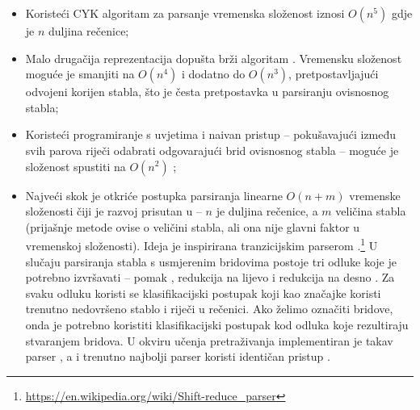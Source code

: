 \begin{itemize}
  \item Koristeći CYK algoritam za parsanje vremenska složenost iznosi
  $O(n^5)$ gdje je $n$ duljina rečenice;

  \item Malo drugačija reprezentacija dopušta brži algoritam
  \citep{eisner1999efficient}. Vremensku složenost moguće je smanjiti na
  $O(n^4)$ i dodatno do $O(n^3)$, pretpostavljajući odvojeni korijen 
  stabla, što je česta pretpostavka u parsiranju ovisnosnog stabla;

  \item Koristeći programiranje s uvjetima  i
  naivan pristup -- pokušavajući između svih parova riječi odabrati odgovarajući
  brid ovisnosnog stabla -- moguće je složenost spustiti na $O(n^2)$
  \citep{covington2001fundamental};

  \item Najveći skok je otkriće postupka parsiranja linearne $O(n + m)$
  vremenske složenosti čiji je razvoj prisutan u \citep{nivre03efficient,
  zhang2011transition, bohnet2012transition} -- $n$ je duljina rečenice, a $m$
  veličina stabla (prijašnje metode ovise o veličini stabla, ali ona nije glavni
  faktor u vremenskoj složenosti). Ideja je inspirirana tranzicijskim parserom
  .\footnote{\url{https://en.wikipedia.org/wiki/Shift-reduce_parser}} U
  slučaju parsiranja stabla s usmjerenim bridovima  postoje
  tri odluke koje je potrebno izvršavati -- pomak , redukcija na
  lijevo  i redukcija na desno . Za svaku
  odluku koristi se klasifikacijski postupak koji kao značajke koristi trenutno
  nedovršeno stablo i riječi u rečenici. Ako želimo označiti bridove, onda je
  potrebno koristiti klasifikacijski postupak kod odluka koje rezultiraju
  stvaranjem bridova. U okviru učenja pretraživanja implementiran je takav
  parser \citep{chang2015learning}, a i trenutno najbolji parser koristi
  identičan pristup \citep{andor2016globally}.

\end{itemize}

